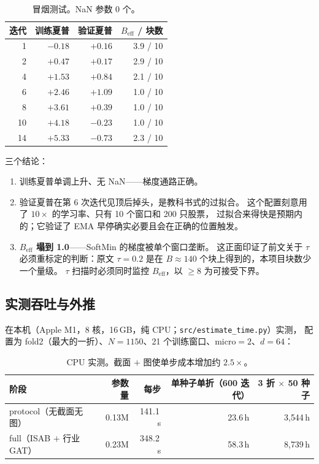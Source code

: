 \documentclass[11pt, a4paper]{ctexart}
\newcommand{\file}[1]{\texttt{\small #1}}
\begin{document}
\begin{table}[h]
\centering
\small
\begin{tabular}{rrrr}
\toprule
迭代 & 训练夏普 & 验证夏普 & $B_{\text{eff}}$ / 块数 \\
\midrule
1  & $-0.18$ & $+0.16$ & 3.9 / 10 \\
2  & $+0.47$ & $+0.17$ & 2.9 / 10 \\
4  & $+1.53$ & $+0.84$ & 2.1 / 10 \\
6  & $+2.46$ & $\mathbf{+1.09}$ & 1.0 / 10 \\
8  & $+3.61$ & $+0.39$ & 1.0 / 10 \\
10 & $+4.18$ & $-0.23$ & 1.0 / 10 \\
14 & $+5.33$ & $-0.73$ & 2.3 / 10 \\
\bottomrule
\end{tabular}
\caption{冒烟测试。NaN 参数 0 个。}
\end{table}

三个结论：
\begin{enumerate}
  \item 训练夏普单调上升、无 NaN——梯度通路正确。
  \item 验证夏普在第 6 次迭代见顶后掉头，是教科书式的过拟合。
        这个配置刻意用了 $10\times$ 的学习率、只有 10 个窗口和 200 只股票，
        过拟合来得快是预期内的；它验证了 EMA 早停确实必要且会在正确的位置触发。
  \item \textbf{$B_{\text{eff}}$ 塌到 1.0}——SoftMin 的梯度被单个窗口垄断。
        这正面印证了前文关于 $\tau$ 必须重标定的判断：原文 $\tau{=}0.2$ 是在
        $B\approx140$ 个块上得到的，本项目块数少一个量级。
        $\tau$ 扫描时必须同时监控 $B_{\text{eff}}$，以 $\ge 8$ 为可接受下界。
\end{enumerate}

\subsection{实测吞吐与外推}
在本机（Apple M1，8 核，16\,GB，纯 CPU；\file{src/estimate\_time.py}）实测，
配置为 fold2（最大的一折）、$N{=}1150$、21 个训练窗口、micro$=2$、$d{=}64$：

\begin{table}[h]
\centering
\small
\begin{tabular}{lrrrr}
\toprule
阶段 & 参数量 & 每步 & 单种子单折（600 迭代） & 3 折 $\times$ 50 种子 \\
\midrule
protocol（无截面无图） & 0.13M & 141.1\,s & 23.6\,h & 3{,}544\,h \\
full（ISAB $+$ 行业 GAT） & 0.23M & 348.2\,s & 58.3\,h & 8{,}739\,h \\
\bottomrule
\end{tabular}
\caption{CPU 实测。截面 $+$ 图使单步成本增加约 $2.5\times$。}
\end{table}
\end{document}
